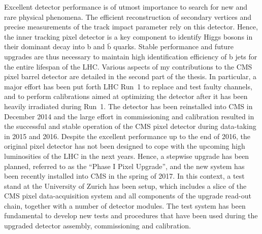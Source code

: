 \noindent Excellent detector performance is of utmost importance to search for new and rare physical phenomena.
The efficient reconstruction of secondary vertices and precise measurements of the track impact parameter rely on this detector.
Hence, the inner tracking pixel detector is a key component to identify Higgs bosons in their dominant decay into b and $\bar{\mathrm{b}}$ quarks.
Stable performance and future upgrades are thus necessary to maintain high identification efficiency of b jets for the entire lifespan of the LHC.
Various aspects of my contributions to the CMS pixel barrel detector are detailed in the second part of the thesis.
In particular, a major effort has been put forth LHC Run~1 to replace and test faulty channels,
and to perform calibrations aimed at optimizing the detector after it has been heavily irradiated during Run~1.
The detector has been reinstalled into CMS in December 2014 and the large effort in commissioning and calibration 
resulted in the successful and stable operation of the CMS pixel detector during data-taking in 2015 and 2016.
Despite the excellent performance up to the end of 2016, the original pixel detector has not been designed to cope with the upcoming high luminosities of the LHC in the next years.
Hence, a stepwise upgrade has been planned, referred to as the ``Phase I Pixel Upgrade'', and the new system has been recently installed into CMS in the spring of 2017.
In this context, a test stand at the University of Zurich has been setup, which includes a slice of the CMS pixel data-acquisition system and all components of the upgrade read-out chain, together with a number of detector modules.
The test system has been fundamental to develop new tests and procedures that have been used during the upgraded detector assembly, commissioning and calibration.

\vspace*{\fill}
